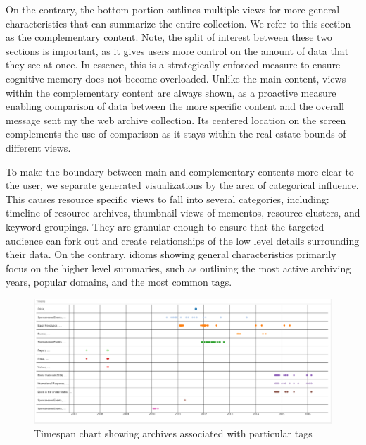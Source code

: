\documentclass[10pt,journal,compsoc]{IEEEtran}
\begin{document}
On the contrary, the bottom portion outlines multiple views for more general characteristics that can summarize the entire collection. We refer to this section as the complementary content. Note, the split of interest between these two sections is important, as it gives users more control on the amount of data that they see at once. In essence, this is a strategically enforced measure to ensure cognitive memory does not become overloaded. Unlike the main content, views within the complementary content are always shown, as a proactive measure enabling comparison of data between the more specific content and the overall message sent my the web archive collection. Its centered location on the screen complements the use of comparison as it stays within the real estate bounds of different views. \par

To make the boundary between main and complementary contents more clear to the user, we separate generated visualizations by the area of categorical influence. This causes resource specific views to fall into several categories, including: timeline of resource archives, thumbnail views of mementos, resource clusters, and keyword groupings. They are granular enough to ensure that the targeted audience can fork out and create relationships of the low level details surrounding their data. On the contrary, idioms showing general characteristics primarily focus on the higher level summaries, such as outlining the most active archiving years, popular domains, and the most common tags. \par 

\begin{figure}
\centering
\includegraphics[width=\textwidth]{Figure4}
\caption{Timespan chart showing archives associated with particular tags}
\label{fig:mesh3}
\end{figure}
\end{document}
